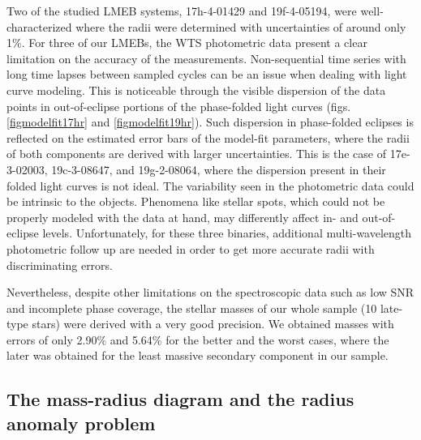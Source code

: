 \documentclass[fleqn,usenatbib]{mnras}
\begin{document}
Two of the studied LMEB systems, 17h-4-01429 and 19f-4-05194, were well-characterized where the radii were determined with uncertainties of around only 1\%. For three of our LMEBs, the WTS photometric data present a clear limitation on the accuracy of the measurements. Non-sequential time series with long time lapses between sampled cycles can be an issue when dealing with light curve modeling. This is noticeable through the visible dispersion of the data points in out-of-eclipse portions of the phase-folded light curves (figs. \ref{figmodelfit17hr} and \ref{figmodelfit19hr}). Such dispersion in phase-folded eclipses is reflected on the estimated error bars of the model-fit parameters, where the radii of both components are derived with larger uncertainties. 
This is the case of 17e-3-02003, 19c-3-08647, and 19g-2-08064, %
where the dispersion present in their folded light curves is not ideal. The variability seen in the photometric data could be intrinsic to the objects. Phenomena like stellar spots, which could not be properly modeled with the data at hand, may differently affect in- and out-of-eclipse levels. Unfortunately, for these three binaries, additional multi-wavelength photometric follow up are needed in order to get more accurate radii with discriminating errors. 

Nevertheless, despite other limitations on the spectroscopic data such as low SNR and incomplete phase coverage, the stellar masses of our whole sample (10 late-type stars) were derived with a very good precision. We obtained masses with errors of only 2.90\% and 5.64\% for the better and the worst cases, where the later was obtained for the least massive secondary component in our sample.


\subsection{The mass-radius diagram and the radius anomaly problem}\label{Ranomaly}
\end{document}

